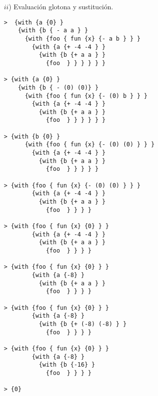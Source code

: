 $ii$) Evaluación glotona y sustitución. \newline

\begin{lstlisting}
>  {with {a {0} }
    {with {b { - a a } }
      {with {foo { fun {x} {- a b } } }
        {with {a {+ -4 -4 } }
          {with {b {+ a a } }
            {foo  } } } } } }

> {with {a {0} }
    {with {b { - (0) (0)} }
      {with {foo { fun {x} {- (0) b } } }
        {with {a {+ -4 -4 } }
          {with {b {+ a a } }
            {foo  } } } } } }

> {with {b {0} }
      {with {foo { fun {x} {- (0) (0) } } }
        {with {a {+ -4 -4 } }
          {with {b {+ a a } }
            {foo  } } } } }

> {with {foo { fun {x} {- (0) (0) } } }
        {with {a {+ -4 -4 } }
          {with {b {+ a a } }
            {foo  } } } }

> {with {foo { fun {x} {0} } }
        {with {a {+ -4 -4 } }
          {with {b {+ a a } }
            {foo  } } } }

> {with {foo { fun {x} {0} } }
        {with {a {-8} }
          {with {b {+ a a } }
            {foo  } } } }

> {with {foo { fun {x} {0} } }
        {with {a {-8} }
          {with {b {+ (-8) (-8) } }
            {foo  } } } }

> {with {foo { fun {x} {0} } }
        {with {a {-8} }
          {with {b {-16} }
            {foo  } } } }

> {0}
\end{lstlisting}

